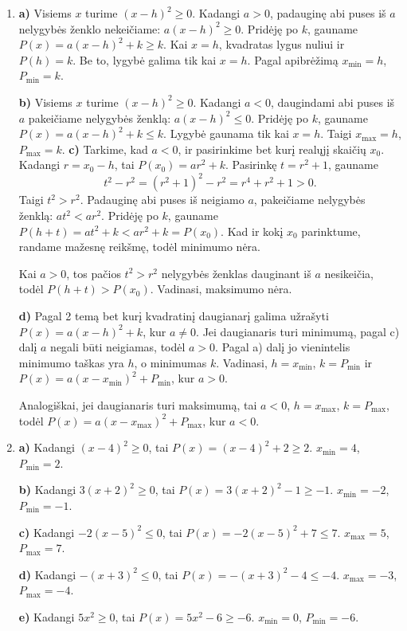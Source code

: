 \documentclass[12pt,a4paper]{article}
\begin{document}
\begin{enumerate}
\textbf{d)} Supainiota $x$ reikšmė ir daugianario reikšmė: $-1$ nurodo, kada pasiekiamas maksimumas, o $5$ yra didžiausia reikšmė.
\item \textbf{a)} Visiems $x$ turime $(x-h)^2\ge0$. Kadangi $a>0$, padauginę abi puses iš $a$ nelygybės ženklo nekeičiame: $a(x-h)^2\ge0$. Pridėję po $k$, gauname $P(x)=a(x-h)^2+k\ge k$. Kai $x=h$, kvadratas lygus nuliui ir $P(h)=k$. Be to, lygybė galima tik kai $x=h$. Pagal apibrėžimą $x_{\min}=h$, $P_{\min}=k$.

\textbf{b)} Visiems $x$ turime $(x-h)^2\ge0$. Kadangi $a<0$, daugindami abi puses iš $a$ pakeičiame nelygybės ženklą: $a(x-h)^2\le0$. Pridėję po $k$, gauname $P(x)=a(x-h)^2+k\le k$. Lygybė gaunama tik kai $x=h$. Taigi $x_{\max}=h$, $P_{\max}=k$.
\textbf{c)} Tarkime, kad $a<0$, ir pasirinkime bet kurį realųjį skaičių $x_0$. Kadangi $r=x_0-h$, tai $P(x_0)=ar^2+k$. Pasirinkę $t=r^2+1$, gauname
\[
t^2-r^2=(r^2+1)^2-r^2=r^4+r^2+1>0.
\]
Taigi $t^2>r^2$. Padauginę abi puses iš neigiamo $a$, pakeičiame nelygybės ženklą: $at^2<ar^2$. Pridėję po $k$, gauname $P(h+t)=at^2+k<ar^2+k=P(x_0)$. Kad ir kokį $x_0$ parinktume, randame mažesnę reikšmę, todėl minimumo nėra.

Kai $a>0$, tos pačios $t^2>r^2$ nelygybės ženklas dauginant iš $a$ nesikeičia, todėl $P(h+t)>P(x_0)$. Vadinasi, maksimumo nėra.

\textbf{d)} Pagal 2 temą bet kurį kvadratinį daugianarį galima užrašyti $P(x)=a(x-h)^2+k$, kur $a\ne0$. Jei daugianaris turi minimumą, pagal c) dalį $a$ negali būti neigiamas, todėl $a>0$. Pagal a) dalį jo vienintelis minimumo taškas yra $h$, o minimumas $k$. Vadinasi, $h=x_{\min}$, $k=P_{\min}$ ir $P(x)=a(x-x_{\min})^2+P_{\min}$, kur $a>0$.

Analogiškai, jei daugianaris turi maksimumą, tai $a<0$, $h=x_{\max}$, $k=P_{\max}$, todėl $P(x)=a(x-x_{\max})^2+P_{\max}$, kur $a<0$.
\item \textbf{a)} Kadangi $(x-4)^2\ge0$, tai $P(x)=(x-4)^2+2\ge2$. $x_{\min}=4$, $P_{\min}=2$.

\textbf{b)} Kadangi $3(x+2)^2\ge0$, tai $P(x)=3(x+2)^2-1\ge-1$. $x_{\min}=-2$, $P_{\min}=-1$.

\textbf{c)} Kadangi $-2(x-5)^2\le0$, tai $P(x)=-2(x-5)^2+7\le7$. $x_{\max}=5$, $P_{\max}=7$.

\textbf{d)} Kadangi $-(x+3)^2\le0$, tai $P(x)=-(x+3)^2-4\le-4$. $x_{\max}=-3$, $P_{\max}=-4$.

\textbf{e)} Kadangi $5x^2\ge0$, tai $P(x)=5x^2-6\ge-6$. $x_{\min}=0$, $P_{\min}=-6$.


\end{enumerate}
\end{document}

